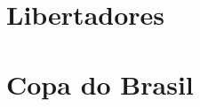 \documentclass{article}
\begin{document}
\section{Libertadores}






\section{Copa do Brasil}


\end{document}
